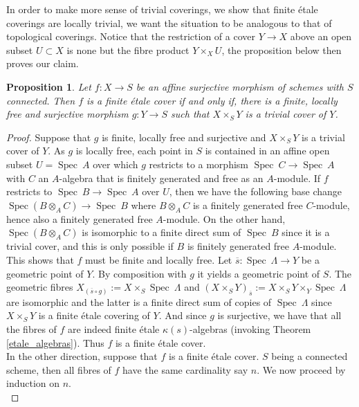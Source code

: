 \documentclass{article}
\theoremstyle{plain}
\newtheorem{proposition}[theorem]{Proposition}
\theoremstyle{definition}
\DeclareMathOperator{\Spec}{Spec}
\begin{document}
\noindent In order to make more sense of trivial coverings, we show that finite \'etale coverings are locally trivial, we want the situation to be analogous to that of topological coverings.
Notice that the restriction of a cover $Y\rightarrow X$ above an open subset $U\subset X$ is none but the fibre product $Y\times_XU$, the proposition below then proves our claim.

\begin{proposition}
\label{etale_cover_locally_trivial}
    Let $f:X\rightarrow S$ be an affine surjective morphism of schemes with $S$ connected. Then $f$ is a finite \'etale cover if and only if, there is a finite, locally free and surjective morphism $g:Y\rightarrow S$ such that $X\times_SY$ is a trivial cover of $Y$.
\end{proposition}
\begin{proof}
    Suppose that $g$ is finite, locally free and surjective and $X\times_SY$ is a trivial cover of $Y$.
    As $g$ is locally free, each point in $S$ is contained in an affine open subset $U=\Spec\:A$ over which $g$ restricts to a morphism $\Spec\:C\rightarrow\Spec\:A$ with $C$ an $A$-algebra that is finitely generated and free as an $A$-module.
    If $f$ restricts to $\Spec\:B\rightarrow \Spec\:A$ over $U$, then we have the following base change $\Spec(B\otimes_AC) \rightarrow \Spec\:B$ where $B\otimes_AC$ is a finitely generated free $C$-module, hence also a finitely generated free $A$-module.
    On the other hand, $\Spec(B\otimes_AC)$ is isomorphic to a finite direct sum of $\Spec\:B$ since it is a trivial cover, and this is only possible if $B$ is finitely generated free $A$-module.
    This shows that $f$ must be finite and locally free.
    Let $\overline{s}:\Spec\:\Lambda \rightarrow Y$ be a geometric point of $Y$. By composition with $g$ it yields a geometric point of $S$.
    The geometric fibres $X_{(\overline{s}\circ g)} := X\times_S \Spec\:\Lambda$ and $(X\times_SY)_{\overline{s}}:= X\times_SY\times_Y\Spec\:\Lambda$ are isomorphic and the latter is a finite direct sum of copies of $\Spec\:\Lambda$ since $X\times_SY$ is a finite \'etale covering of $Y$.
    And since $g$ is surjective, we have that all the fibres of $f$ are indeed finite \'etale $\kappa(s)$-algebras (invoking Theorem \ref{etale_algebras}). Thus $f$ is a finite \'etale cover.\\
    In the other direction, suppose that $f$ is a finite \'etale cover.
    $S$ being a connected scheme, then all fibres of $f$ have the same cardinality say $n$.
    We now proceed by induction on $n$.\\

\end{proof}
\end{document}
